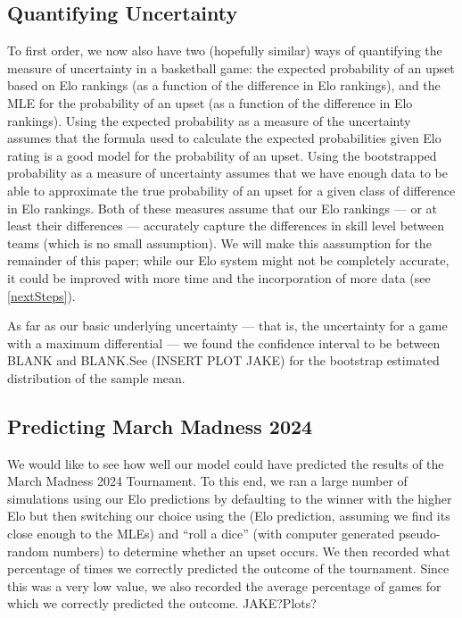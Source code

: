 \documentclass{article}
\begin{document}
\subsection{Quantifying Uncertainty}
To first order, we now also have two (hopefully similar) ways of quantifying the measure of uncertainty in a basketball game: the expected probability of an upset based on Elo rankings (as a function of the difference in Elo rankings), and the MLE for the probability of an upset (as a function of the difference in Elo rankings). Using the expected probability as a measure of the uncertainty assumes that the formula used to calculate the expected probabilities given Elo rating is a good model for the probability of an upset. Using the bootstrapped probability as a measure of uncertainty assumes that we have enough data to be able to approximate the true probability of an upset for a given class of difference in Elo rankings. Both of these measures assume that our Elo rankings --- or at least their differences --- accurately capture the differences in skill level between teams (which is no small assumption). We will make this aassumption for the remainder of this paper; while our Elo system might not be completely accurate, it could be improved with more time and the incorporation of more data (see \autoref{nextSteps}).

As far as our basic underlying uncertainty --- that is, the uncertainty for a game with a maximum differential --- we found the confidence interval to be between BLANK and BLANK.\@ See (INSERT PLOT JAKE) for the bootstrap estimated distribution of the sample mean.





\subsection{Predicting March Madness 2024}
We would like to see how well our model could have predicted the results of the March Madness 2024 Tournament. To this end, we ran a large number of simulations using our Elo predictions by defaulting to the winner with the higher Elo but then switching our choice using the (Elo prediction, assuming we find its close enough to the MLEs) and ``roll a dice'' (with computer generated pseudo-random numbers) to determine whether an upset occurs. We then recorded what percentage of times we correctly predicted the outcome of the tournament. Since this was a very low value, we also recorded the average percentage of games for which we correctly predicted the outcome. JAKE?\@ Plots?
\end{document}
